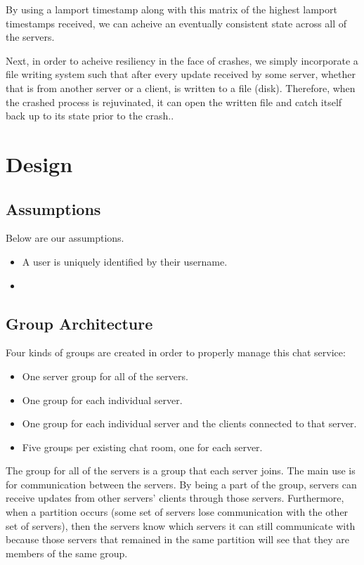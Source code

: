 \documentclass[12pt,journal,compsoc]{IEEEtran}
\begin{document}
By using a lamport timestamp along with this matrix of the highest lamport timestamps received, we can acheive an eventually consistent state across all of the servers.

Next, in order to acheive resiliency in the face of crashes, we simply incorporate a file writing system such that after every update received by some server, whether that is from another server or a client, is written to a file (disk). Therefore, when the crashed process is rejuvinated, it can open the written file and catch itself back up to its state prior to the crash..

\section{Design}
\subsection{Assumptions}
Below are our assumptions.
\begin{itemize}
\item A user is uniquely identified by their username.
\item 
\end{itemize}
\subsection{Group Architecture}
Four kinds of groups are created in order to properly manage this chat service:
\begin{itemize}
\item One server group for all of the servers.
\item One group for each individual server.
\item One group for each individual server and the clients connected to that server.
\item Five groups per existing chat room, one for each server.
\end{itemize}

The group for all of the servers is a group that each server joins. The main use is for communication between the servers. By being a part of the group, servers can receive updates from other servers' clients through those servers. Furthermore, when a partition occurs (some set of servers lose communication with the other set of servers), then the servers know which servers it can still communicate with because those servers that remained in the same partition will see that they are members of the same group.
\end{document}

